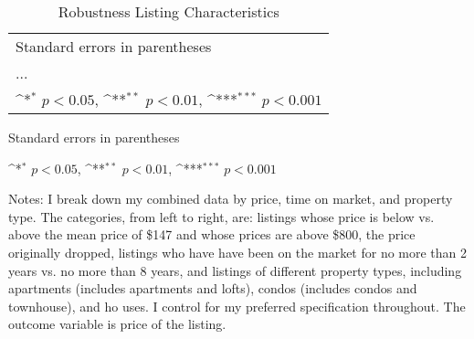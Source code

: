 \documentclass[11pt, oneside]{article}
\begin{document}
\newpage
\begin{landscape}
	\begin{table}[htbp]\centering
		\def\sym#1{\ifmmode^{#1}\else\(^{#1}\)\fi}
		\caption{Robustness Listing Characteristics}
		\begin{tabular}{l*{9}{c}}
			\hline\hline
			\hline\hline
			\multicolumn{10}{l}{\footnotesize Standard errors in parentheses}\\
			\multicolumn{10}{l}{\footnotesize ...}\\
			\multicolumn{10}{l}{\footnotesize \sym{*} \(p<0.05\), \sym{**} \(p<0.01\), \sym{***} \(p<0.001\)}\\
		\end{tabular}
		\begin{tablenotes}
			\item \footnotesize Standard errors in parentheses
			\item \footnotesize \sym{*} \(p<0.05\), \sym{**} \(p<0.01\), \sym{***} \(p<0.001\)
			\item Notes: I break down my combined data by price, time on market, and property type. The categories, from left to right, are: listings whose price is below vs. above the mean price of \$147 and whose prices are above \$800, the price originally dropped, listings who have have been on the market for no more than 2 years vs. no more than 8 years, and listings of different property types, including apartments (includes apartments and lofts), condos (includes condos and townhouse), and ho uses. I control for my preferred specification throughout. The outcome variable is price of the listing.
		\end{tablenotes}
	\end{table}
\end{landscape}

\begin{table}[htbp]\centering
	\def\sym#1{\ifmmode^{#1}\else\(^{#1}\)\fi}
	\caption{}
\end{table}
\end{document}
